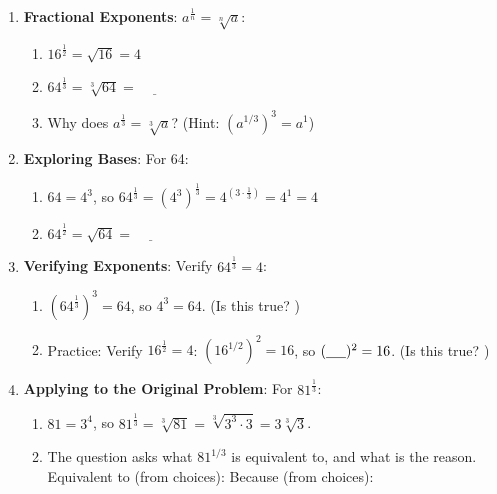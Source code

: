 \documentclass[12pt]{article}
\begin{document}
\begin{enumerate}[label=31.\arabic*]
    \item \textbf{Fractional Exponents}: \( a^{\frac{1}{n}} = \sqrt[n]{a} \):
    \begin{enumerate}[label=\alph*)]
        \item \( 16^{\frac{1}{2}} = \sqrt{16} = 4 \)
        \item \( 64^{\frac{1}{3}} = \sqrt[3]{64} = \underline{\hspace{1cm}} \)
        \item Why does \( a^{\frac{1}{3}} = \sqrt[3]{a} \)? \underline{\hspace{6cm}} (Hint: \((a^{1/3})^3 = a^1\))
    \end{enumerate}
    \item \textbf{Exploring Bases}: For 64:
    \begin{enumerate}[label=\alph*)]
        \item \( 64 = 4^3 \), so \( 64^{\frac{1}{3}} = (4^3)^{\frac{1}{3}} = 4^{(3 \cdot \frac{1}{3})} = 4^1 = 4 \)
        \item \( 64^{\frac{1}{2}} = \sqrt{64} = \underline{\hspace{1cm}} \)
    \end{enumerate}
    \item \textbf{Verifying Exponents}: Verify \( 64^{\frac{1}{3}} = 4 \):
    \begin{enumerate}[label=\alph*)]
        \item \( (64^{\frac{1}{3}})^3 = 64 \), so \( 4^3 = 64 \). (Is this true? \underline{\hspace{0.5cm}})
        \item Practice: Verify \( 16^{\frac{1}{2}} = 4 \): \( (16^{1/2})^2 = 16 \), so \( (\underline{\hspace{0.5cm}})^2 = 16 \). (Is this true? \underline{\hspace{0.5cm}})
    \end{enumerate}
    \item \textbf{Applying to the Original Problem}: For \( 81^{\frac{1}{3}} \):
    \begin{enumerate}[label=\alph*)]
        \item \( 81 = 3^4 \), so \( 81^{\frac{1}{3}} = \sqrt[3]{81} = \sqrt[3]{3^3 \cdot 3} = 3\sqrt[3]{3} \).
        \item The question asks what \(81^{1/3}\) is equivalent to, and what is the reason.
        Equivalent to (from choices): \underline{\hspace{1.5cm}}
        Because (from choices): \underline{\hspace{2cm}}
    \end{enumerate}
\end{enumerate}
\end{document}
